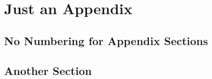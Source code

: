
\chapter{Just an Appendix}

\lipsum[1]

\section*{No Numbering for Appendix Sections}

\lipsum[2-4]

\section*{Another Section}

\lipsum[5-6]
